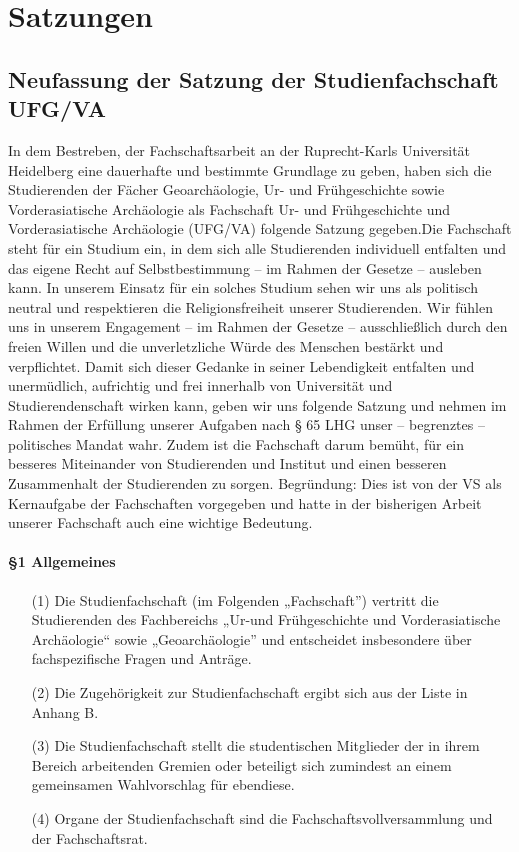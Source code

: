 \section{Satzungen}
\subsection{Neufassung der Satzung der Studienfachschaft UFG/VA}\label{appendix:1}
    In dem Bestreben, der Fachschaftsarbeit an der Ruprecht-Karls Universität Heidelberg
    eine dauerhafte und bestimmte Grundlage zu geben, haben sich die Studierenden der
    Fächer Geoarchäologie, Ur- und Frühgeschichte sowie Vorderasiatische Archäologie als
    Fachschaft Ur- und Frühgeschichte und Vorderasiatische Archäologie (UFG/VA) folgende
    Satzung gegeben.\newline Die Fachschaft steht für ein Studium ein, in dem sich alle Studierenden individuell
    entfalten und das eigene Recht auf Selbstbestimmung – im Rahmen der Gesetze –
    ausleben kann. In unserem Einsatz für ein solches Studium sehen wir uns als politisch
    neutral und respektieren die Religionsfreiheit unserer Studierenden. Wir fühlen uns
    in unserem Engagement – im Rahmen der Gesetze – ausschließlich durch den freien
    Willen und die unverletzliche Würde des Menschen bestärkt und verpflichtet. Damit
    sich dieser Gedanke in seiner Lebendigkeit entfalten und unermüdlich, aufrichtig und
    frei innerhalb von Universität und Studierendenschaft wirken kann, geben wir uns
    folgende Satzung und nehmen im Rahmen der Erfüllung unserer Aufgaben nach § 65 LHG
    unser – begrenztes – politisches Mandat wahr. Zudem ist die Fachschaft darum bemüht,
    für ein besseres Miteinander von Studierenden und Institut und einen besseren
    Zusammenhalt der Studierenden zu sorgen. Begründung: Dies ist von der VS als
    Kernaufgabe der Fachschaften vorgegeben und hatte in der bisherigen Arbeit unserer
    Fachschaft auch eine wichtige Bedeutung.
    \\
    \paragraph{§1 Allgemeines}
    \begin{enumerate}
        \item[(1)] {Die Studienfachschaft (im Folgenden „Fachschaft”) vertritt die Studierenden des Fachbereichs „Ur-und Frühgeschichte und Vorderasiatische Archäologie“ sowie „Geoarchäologie” und entscheidet insbesondere über fachspezifische Fragen und Anträge.}
        \item[(2)] {Die Zugehörigkeit zur Studienfachschaft ergibt sich aus der Liste in Anhang B.}
        \item[(3)] {Die Studienfachschaft stellt die studentischen Mitglieder der in ihrem Bereich        arbeitenden Gremien oder beteiligt sich zumindest an einem gemeinsamen Wahlvorschlag        für ebendiese.}
        \item[(4)] {Organe der Studienfachschaft sind die Fachschaftsvollversammlung und der        Fachschaftsrat.}
    \end{enumerate}
